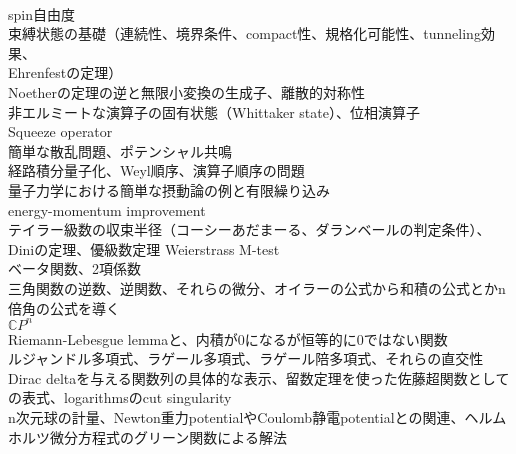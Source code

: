 \documentclass[dvipdfmx, uplatex]{jsarticle}
\begin{document}
\\spin自由度
\\束縛状態の基礎（連続性、境界条件、compact性、規格化可能性、tunneling効果、
\\Ehrenfestの定理）
\\Noetherの定理の逆と無限小変換の生成子、離散的対称性
\\非エルミートな演算子の固有状態（Whittaker state）、位相演算子
\\Squeeze operator
\\簡単な散乱問題、ポテンシャル共鳴
\\経路積分量子化、Weyl順序、演算子順序の問題
\\量子力学における簡単な摂動論の例と有限繰り込み
\\energy-momentum improvement
\\テイラー級数の収束半径（コーシーあだまーる、ダランベールの判定条件）、Diniの定理、優級数定理 Weierstrass M-test
\\ベータ関数、2項係数
\\三角関数の逆数、逆関数、それらの微分、オイラーの公式から和積の公式とかn倍角の公式を導く
\\$\mathbb{C}P^n$
\\Riemann-Lebesgue lemmaと、内積が0になるが恒等的に0ではない関数
\\ルジャンドル多項式、ラゲール多項式、ラゲール陪多項式、それらの直交性
\\Dirac deltaを与える関数列の具体的な表示、留数定理を使った佐藤超関数としての表式、logarithmsのcut singularity
\\n次元球の計量、Newton重力potentialやCoulomb静電potentialとの関連、ヘルムホルツ微分方程式のグリーン関数による解法

\newpage


\newpage


\newpage


\newpage


\newpage
{}
\end{document}
